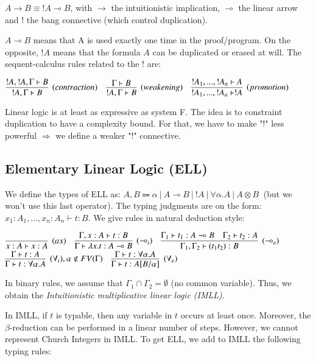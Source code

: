 \documentclass[a4paper,10pt]{article}
\newcommand{\impl}{\rightarrow}	%
\newcommand{\limpl}{\multimap}  %
\begin{document}
$A \impl B \equiv ! A \limpl B$, with $\impl$ the intuitionistic implication, $\limpl$ the linear arrow and $!$ the bang connective (which control duplication).

$A \limpl B$ means that A is used exactly one time in the proof/program. On the opposite, $!A$ means that the formula $A$ can be duplicated or erased at will. The sequent-calculus rules related to the $!$ are:
\begin{center}
$	\infer[(contraction)]{!A, \Gamma \vdash B}{!A, !A, \Gamma \vdash B} \quad
	\infer[(weakening)]{!A, \Gamma \vdash B}{\Gamma \vdash B} \quad
	\infer[(promotion)]{!A_{1}, ... , !A_{n} \vdash !A }{!A_{1}, ... , !A_{n} \vdash A}
$
\end{center}

 Linear logic is at least as expressive as system F. The idea is to constraint duplication to have a complexity bound. For that, we have to make "$!$" less powerful $\Rightarrow$ we define a weaker "$!$" connective.


\subsection{Elementary Linear Logic (ELL)}
 We define the types of ELL as: $A,B \Coloneqq \alpha \ | \ A \limpl B \ | \ !A \ | \ \forall \alpha.A \ | \ A \otimes B \ $ (but we won't use this last operator). The typing judgments are on the form: $x_1 : A_1, ..., x_n : A_n \vdash t:B$. We give rules in natural deduction style:
\begin{center}
$	\infer[(ax)]{x:A \vdash x:A}{} \quad
	\infer[(\limpl_i)]{\Gamma \vdash \lambda x.t : A \limpl B}{\Gamma, x:A \vdash t:B} \quad
	\infer[(\limpl_e)]{\Gamma_1, \Gamma_2 \vdash (t_1 t_2) : B}{\Gamma_1 \vdash t_1 : A \limpl B & \Gamma_2 \vdash t_2 : A }$\\
\vspace{0.2cm}
$	\infer[(\forall_i), \alpha \notin FV(\Gamma)]{\Gamma \vdash t:\forall \alpha.A}{\Gamma \vdash t:A} \quad
	\infer[(\forall_e)]{\Gamma \vdash t:A[B/\alpha]}{\Gamma \vdash t:\forall \alpha.A}
$
\end{center}

In binary rules, we assume that $\Gamma_1 \cap \Gamma_2 = \emptyset$ (no common variable). Thus, we obtain the \emph{Intuitionistic multiplicative linear logic (IMLL)}.


In IMLL, if $t$ is typable, then any variable in $t$ occurs at least once. Moreover, the $\beta$-reduction can be performed in a linear number of steps. However, we cannot represent Church Integers in IMLL. To get ELL, we add to IMLL the following typing rules:
\end{document}
